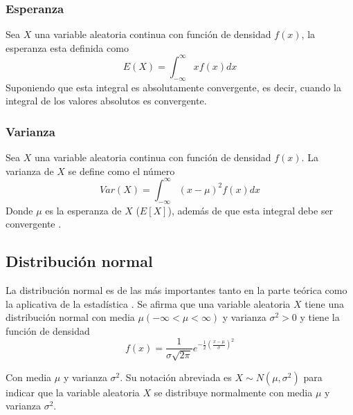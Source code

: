 \subsubsection{Esperanza}
Sea $X$ una variable aleatoria continua con función de densidad $f(x)$, la esperanza esta definida como
\begin{equation}
	E(X) = \int_{- \infty}^{\infty} xf(x)dx
\end{equation}
Suponiendo que esta integral es absolutamente convergente, es decir, cuando la integral de los valores absolutos es convergente.

\subsubsection{Varianza}
Sea $X$ una variable aleatoria continua con función de densidad $f(x)$. La varianza de $X$ se define como el número
\begin{equation}
	Var(X)= \int_{- \infty}^{\infty} {(x-\mu)}^{2} f(x)dx
\end{equation}
Donde $\mu$ es la esperanza de $X$ ($E[X]$), además de que esta integral debe ser convergente \citep{rincon2014introduccion}.

\subsection{Distribución normal}\label{Dist_normal}
La distribución normal es de las más importantes tanto en la parte teórica como la aplicativa de la estadística \citep{hines1988probabilidad}. Se afirma que una variable aleatoria $X$ tiene una distribución normal con media $\mu (- \infty < \mu < \infty)$ y varianza ${\sigma}^{2} > 0$ y tiene la función de densidad
\begin{equation}
	\label{distribucion_normal}
	f(x) = \frac{1}{\sigma \sqrt{2 \pi}} {e}^{-\frac{1}{2} {\left( \frac{x- \mu}{\sigma} \right)}^{2}}
\end{equation}

Con media $\mu$ y varianza ${\sigma}^{2}$. Su notación abreviada es $X \sim N(\mu, {\sigma}^{2})$ para indicar que la variable aleatoria $X$ se distribuye normalmente con media $\mu$ y varianza ${\sigma}^{2}$.

